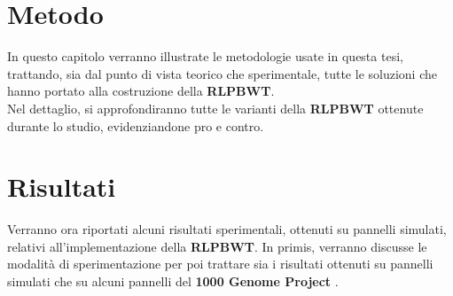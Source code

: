\documentclass[a4paper,12pt, oneside, draft]{book}
\begin{document}
\chapter{Metodo}
\label{metchap}
In questo capitolo verranno illustrate le metodologie usate in questa tesi,
trattando, sia dal punto di vista teorico che sperimentale, tutte le soluzioni
che hanno portato alla costruzione della \textbf{RLPBWT}.\\
Nel dettaglio, si approfondiranno tutte le varianti della \textbf{RLPBWT}
ottenute durante lo studio, evidenziandone pro e contro.







%








\chapter{Risultati}
\label{reschap}
Verranno ora riportati alcuni risultati sperimentali, ottenuti su pannelli
simulati, relativi all'implementazione della \textbf{RLPBWT}. In primis,
verranno discusse le modalità di sperimentazione per poi trattare sia i
risultati ottenuti su pannelli simulati che su alcuni pannelli del \textbf{1000
  Genome Project} \cite{1kgp}. 

%


\end{document}
